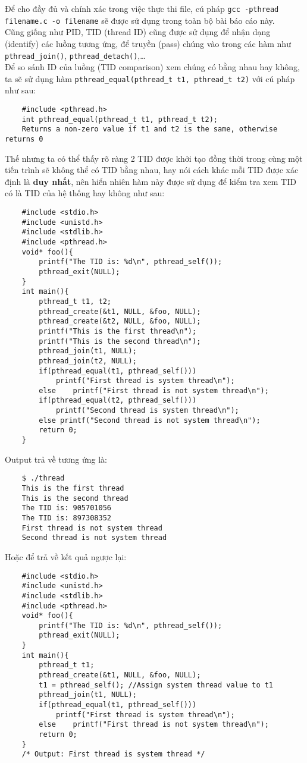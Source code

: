 \documentclass{article}
\begin{document}
Để cho đầy đủ và chính xác trong việc thực thi file, cú pháp \verb|gcc -pthread filename.c -o filename| sẽ được sử dụng trong toàn bộ bài báo cáo này.
\\ Cũng giống như PID, TID (thread ID) cũng được sử dụng để nhận dạng (identify) các luồng tương ứng, để truyền (pass) chúng vào trong các hàm như \verb|pthread_join()|, \verb|pthread_detach()|,\dots
\\ Để so sánh ID của luồng (TID comparison) xem chúng có bằng nhau hay không, ta sẽ sử dụng hàm \verb|pthread_equal(pthread_t t1, pthread_t t2)| với cú pháp như sau:
\begin{verbatim}
    #include <pthread.h>
    int pthread_equal(pthread_t t1, pthread_t t2);
    Returns a non-zero value if t1 and t2 is the same, otherwise returns 0
\end{verbatim}
Thế nhưng ta có thể thấy rõ ràng 2 TID được khởi tạo đồng thời trong cùng một tiến trình sẽ không thể có TID bằng nhau, hay nói cách khác mỗi
TID được xác định là \textbf{duy nhất}, nên hiển nhiên hàm này được sử dụng để kiểm tra xem TID có là TID của hệ thống hay không như sau:
\begin{verbatim}
    #include <stdio.h>
    #include <unistd.h>
    #include <stdlib.h>
    #include <pthread.h>
    void* foo(){
        printf("The TID is: %d\n", pthread_self());
        pthread_exit(NULL);
    }
    int main(){
        pthread_t t1, t2;
        pthread_create(&t1, NULL, &foo, NULL);
        pthread_create(&t2, NULL, &foo, NULL);
        printf("This is the first thread\n");
        printf("This is the second thread\n");
        pthread_join(t1, NULL);
        pthread_join(t2, NULL);
        if(pthread_equal(t1, pthread_self()))
            printf("First thread is system thread\n");
        else    printf("First thread is not system thread\n");
        if(pthread_equal(t2, pthread_self()))
            printf("Second thread is system thread\n");
        else printf("Second thread is not system thread\n");
        return 0;
    }    
\end{verbatim}
Output trả về tương ứng là:
\begin{verbatim}
    $ ./thread
    This is the first thread
    This is the second thread
    The TID is: 905701056
    The TID is: 897308352
    First thread is not system thread
    Second thread is not system thread
\end{verbatim}
Hoặc để trả về kết quả ngược lại:
\begin{verbatim}
    #include <stdio.h>
    #include <unistd.h>
    #include <stdlib.h>
    #include <pthread.h>
    void* foo(){
        printf("The TID is: %d\n", pthread_self());
        pthread_exit(NULL);
    }
    int main(){
        pthread_t t1;
        pthread_create(&t1, NULL, &foo, NULL);
        t1 = pthread_self(); //Assign system thread value to t1
        pthread_join(t1, NULL);
        if(pthread_equal(t1, pthread_self()))
            printf("First thread is system thread\n");
        else    printf("First thread is not system thread\n");
        return 0;
    } 
    /* Output: First thread is system thread */
\end{verbatim}
\end{document}
